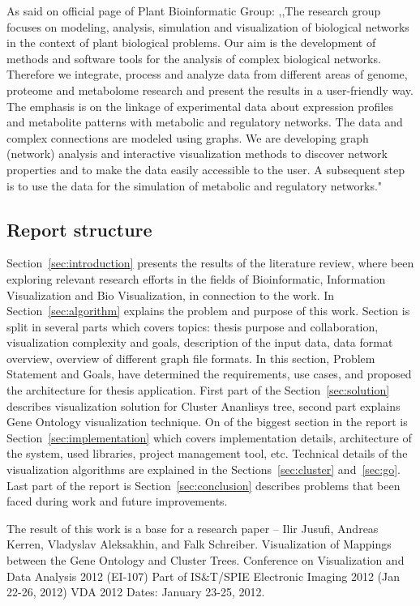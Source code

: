 As said on official page of Plant Bioinformatic Group: ,,The research group focuses on modeling, analysis, simulation and visualization of biological networks in the context of plant biological problems. Our aim is the development of methods and software tools for the analysis of complex biological networks. Therefore we integrate, process and analyze data from different areas of genome, proteome and
metabolome research and present the results in a user-friendly way. The emphasis is on the linkage of experimental data about expression profiles and metabolite patterns with metabolic and regulatory networks. The data and complex connections are modeled using graphs. We are developing graph (network) analysis and interactive visualization methods to discover network properties and to make the data easily accessible to the user. A subsequent step is to use the data for the simulation of metabolic and regulatory networks."~\cite{PBG}


\subsection{Report structure}
\label{sec:structure}

Section~\ref{sec:introduction} presents the results of the literature review, where been exploring relevant research efforts in the fields of Bioinformatic, Information Visualization and Bio Visualization, in connection to the work. In Section~\ref{sec:algorithm} explains the problem and purpose of this work. Section is split in several parts which covers topics: thesis purpose and collaboration, visualization complexity and goals, description of the input data, data format overview, overview of different graph file formats. In this section, Problem Statement and Goals, have determined the requirements, use cases, and proposed the architecture for thesis application. First part of the Section~\ref{sec:solution} describes visualization solution for Cluster Ananlisys tree, second part explains Gene Ontology visualization technique. On of the biggest section in the report is Section~\ref{sec:implementation} which covers implementation details, architecture of the system, used libraries, project management tool, etc. Technical details of the visualization algorithms are explained in the Sections~\ref{sec:cluster} and~\ref{sec:go}. Last part of the report is Section~\ref{sec:conclusion} describes problems that been faced during work and future improvements.

The result of this work is a base for a research paper -- \textsf{Ilir Jusufi, Andreas Kerren, Vladyslav Aleksakhin, and Falk Schreiber. Visualization of Mappings between the Gene Ontology and Cluster Trees. Conference on Visualization and Data Analysis 2012 (EI-107) Part of IS&T/SPIE Electronic Imaging 2012 (Jan 22-26, 2012) VDA 2012 Dates: January 23-25, 2012.}

